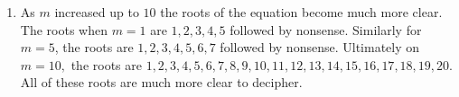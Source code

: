 \documentclass{article}
\begin{document}
\begin{enumerate}
    \item
    
    As $m$ increased up to $10$ the roots of the equation become much more clear. The roots when $m=1$ are $1, 2, 3, 4, 5$ followed by nonsense. Similarly for $m=5$, the roots are $1, 2, 3, 4, 5, 6, 7$ followed by nonsense. Ultimately on $m=10,$ the roots are $1, 2, 3, 4, 5, 6, 7, 8, 9, 10, 11, 12, 13, 14, 15, 16, 17, 18, 19, 20.$ All of these roots are much more clear to decipher.
    
\end{enumerate}
\end{document}
